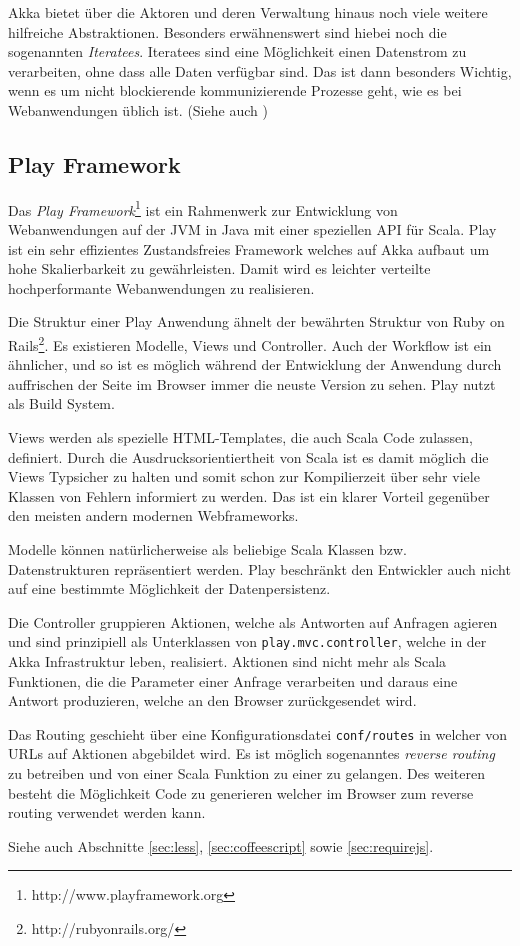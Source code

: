 Akka bietet über die Aktoren und deren Verwaltung hinaus noch viele weitere hilfreiche
Abstraktionen. Besonders erwähnenswert sind hiebei noch die sogenannten \textit{Iteratees}.
Iteratees sind eine Möglichkeit einen Datenstrom zu verarbeiten, ohne dass alle Daten verfügbar
sind. Das ist dann besonders Wichtig, wenn es um nicht blockierende kommunizierende Prozesse geht,
wie es bei Webanwendungen üblich ist. (Siehe auch \cite{iteratees})

\subsection{Play Framework}

Das \textit{Play Framework}\footnote{http://www.playframework.org} ist ein Rahmenwerk zur
Entwicklung von Webanwendungen auf der JVM in Java mit einer speziellen API für Scala. Play ist ein
sehr effizientes Zustandsfreies Framework welches auf Akka aufbaut um hohe Skalierbarkeit zu
gewährleisten. Damit wird es leichter verteilte hochperformante Webanwendungen zu realisieren.

Die Struktur einer Play Anwendung ähnelt der bewährten Struktur von Ruby on
Rails\footnote{http://rubyonrails.org/}. Es existieren Modelle, Views und Controller. Auch der
Workflow ist ein ähnlicher, und so ist es möglich während der Entwicklung der Anwendung durch
auffrischen der Seite im Browser immer die neuste Version zu sehen. Play nutzt  als Build
System.

Views werden als spezielle HTML-Templates, die auch Scala Code zulassen, definiert. Durch die
Ausdrucksorientiertheit von Scala ist es damit möglich die Views Typsicher zu halten und somit schon
zur Kompilierzeit über sehr viele Klassen von Fehlern informiert zu werden. Das ist ein klarer
Vorteil gegenüber den meisten andern modernen Webframeworks.

Modelle können natürlicherweise als beliebige Scala Klassen bzw. Datenstrukturen repräsentiert
werden. Play beschränkt den Entwickler auch nicht auf eine bestimmte Möglichkeit der
Datenpersistenz.

Die Controller gruppieren Aktionen, welche als Antworten auf Anfragen agieren und sind prinzipiell
als Unterklassen von \texttt{play.mvc.controller}, welche in der Akka Infrastruktur leben,
realisiert. Aktionen sind nicht mehr als Scala Funktionen, die die Parameter einer Anfrage
verarbeiten und daraus eine Antwort produzieren, welche an den Browser zurückgesendet wird.

Das Routing geschieht über eine Konfigurationsdatei \texttt{conf/routes} in welcher von URLs auf
Aktionen abgebildet wird. Es ist möglich sogenanntes \textit{reverse routing} zu betreiben und von
einer Scala Funktion zu einer  zu gelangen. Des weiteren besteht die Möglichkeit 
Code zu generieren welcher im Browser zum reverse routing verwendet werden kann.

Siehe auch Abschnitte \ref{sec:less}, \ref{sec:coffeescript} sowie \ref{sec:requirejs}.

\label{sec:play}